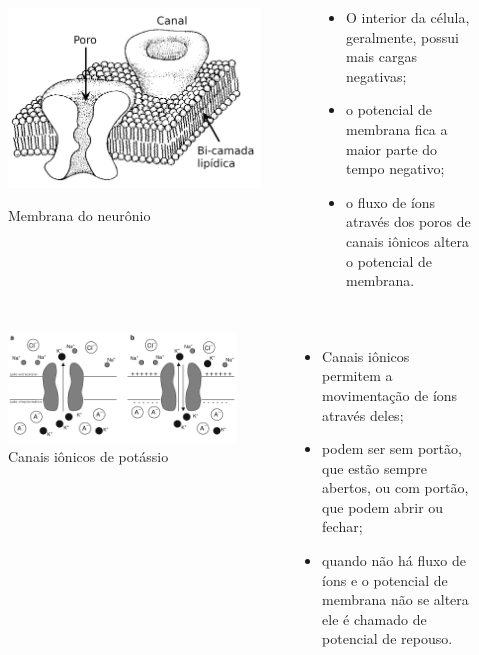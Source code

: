 \begin{frame}
	\begin{columns}[t]
		\column{5cm}
			\begin{figure}[tb]
				\centering
				\caption{Membrana do neurônio}
				\includegraphics[width=0.55\linewidth]{figs/membrana_neuronio}
				\label{fig:membrananeuronio}
			\end{figure}
		\column{5cm}
			\begin{itemize}
				\item O interior da célula, geralmente, possui mais cargas negativas;
				\item o potencial de membrana fica a maior parte do tempo negativo;
				\item o fluxo de íons através dos poros de canais iônicos altera o potencial de membrana.
			\end{itemize}
	\end{columns}
\end{frame}

\begin{frame}
	\begin{columns}[t]
		\column{5cm}
			\begin{figure}[tb!]
				\centering
				\caption{Canais iônicos de potássio}
				\label{fig:canaisions}
				\includegraphics[width=0.7\linewidth]{figs/canais_ions}
			\end{figure}
		\column{5cm}
			\begin{itemize}
				\item Canais iônicos permitem a movimentação de íons através deles;
				\item podem ser sem portão, que estão sempre abertos, ou com portão, que podem abrir ou fechar;
				\item quando não há fluxo de íons e o potencial de membrana não se altera ele é chamado de potencial de repouso.
			\end{itemize}
	\end{columns}
\end{frame}

